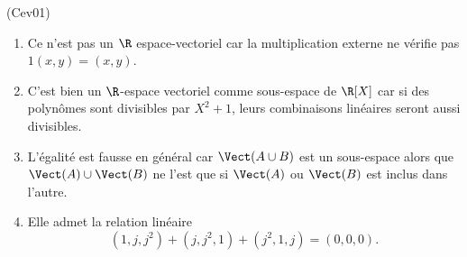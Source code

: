 \begin{tiny}(Cev01)\end{tiny}
\begin{enumerate}
  \item Ce n'est pas un $\R$ espace-vectoriel car la multiplication externe ne vérifie pas $1 (x,y) = (x,y)$.
  \item C'est bien un $\R$-espace vectoriel comme sous-espace de $\R[X]$ car si des polynômes sont divisibles par $X^2 + 1$, leurs combinaisons linéaires seront aussi divisibles.
  \item L'égalité est fausse en général car $\Vect(A \cup B)$ est un sous-espace alors que $\Vect(A)\cup \Vect(B)$ ne l'est que si $\Vect(A)$ ou $\Vect(B)$ est inclus dans l'autre.
  \item Elle admet la relation linéaire
\[
  (1,j,j^2) + (j,j^2,1) + (j^2,1, j)
  = (0,0,0).
\]

\end{enumerate}
